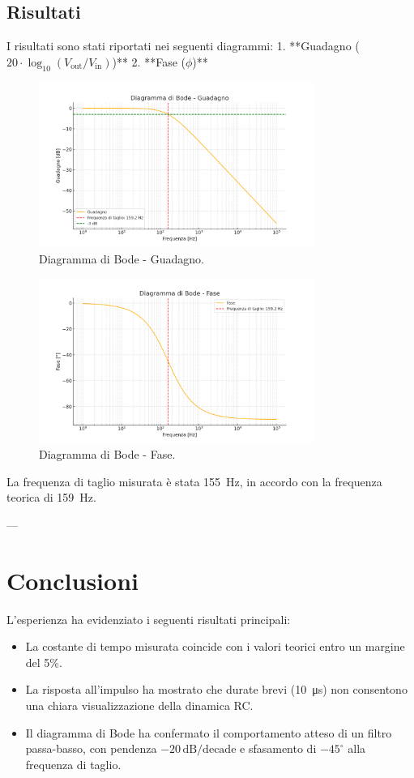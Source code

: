 \documentclass[a4paper,11pt]{article}
\begin{document}
\subsection*{Risultati}
I risultati sono stati riportati nei seguenti diagrammi:  
1. **Guadagno (\(20 \cdot \log_{10}(V_\text{out}/V_\text{in})\))**  
2. **Fase (\(\phi\))**  

\begin{figure}[H]
\centering
\includegraphics[width=0.8\textwidth]{assets/bode_gain.png}
\caption{Diagramma di Bode - Guadagno.}
\end{figure}

\begin{figure}[H]
\centering
\includegraphics[width=0.8\textwidth]{assets/bode_phase.png}
\caption{Diagramma di Bode - Fase.}
\end{figure}

La frequenza di taglio misurata è stata \SI{155}{\hertz}, in accordo con la frequenza teorica di \SI{159}{\hertz}.

---

\section*{Conclusioni}
L’esperienza ha evidenziato i seguenti risultati principali:
\begin{itemize}
    \item La costante di tempo misurata coincide con i valori teorici entro un margine del 5\%.
    \item La risposta all'impulso ha mostrato che durate brevi (\SI{10}{\micro\second}) non consentono una chiara visualizzazione della dinamica RC.
    \item Il diagramma di Bode ha confermato il comportamento atteso di un filtro passa-basso, con pendenza \(-20 \, \mathrm{dB/decade}\) e sfasamento di \(-45^\circ\) alla frequenza di taglio.
\end{itemize}
\end{document}
